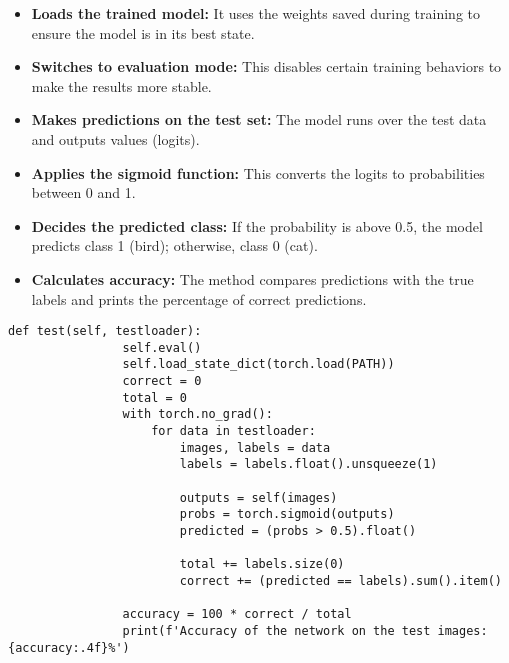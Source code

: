 \begin{itemize}
    \item \textbf{Loads the trained model:} It uses the weights saved during training to ensure the model is in its best state.
    
    \item \textbf{Switches to evaluation mode:} This disables certain training behaviors to make the results more stable.

    \item \textbf{Makes predictions on the test set:} The model runs over the test data and outputs values (logits).

    \item \textbf{Applies the sigmoid function:} This converts the logits to probabilities between 0 and 1.

    \item \textbf{Decides the predicted class:} If the probability is above 0.5, the model predicts class 1 (bird); otherwise, class 0 (cat).

    \item \textbf{Calculates accuracy:} The method compares predictions with the true labels and prints the percentage of correct predictions.
\end{itemize}

\begin{minipage}{\linewidth}
    \begin{lstlisting}[caption=Test, label={lst:test}]
            def test(self, testloader):
                self.eval()
                self.load_state_dict(torch.load(PATH))
                correct = 0
                total = 0
                with torch.no_grad():
                    for data in testloader:
                        images, labels = data
                        labels = labels.float().unsqueeze(1)  
        
                        outputs = self(images)
                        probs = torch.sigmoid(outputs)
                        predicted = (probs > 0.5).float()
        
                        total += labels.size(0)
                        correct += (predicted == labels).sum().item()
        
                accuracy = 100 * correct / total
                print(f'Accuracy of the network on the test images: {accuracy:.4f}%')
    \end{lstlisting}
\end{minipage}